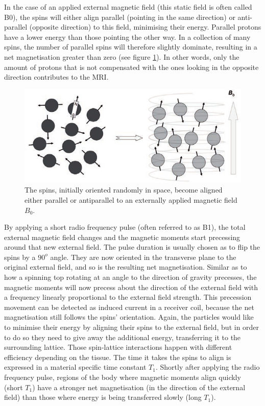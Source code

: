 In the case of an applied external magnetic field (this static field is often called B0), the spins will either align parallel (pointing in the same direction) or anti-parallel (opposite direction) to this field, minimising their energy.
Parallel protons have a lower energy than those pointing the other way.
In a collection of many spins, the number of parallel spins will therefore slightly dominate, resulting in a net magnetisation greater than zero (see figure \ref{fig:spin_align}).
In other words, only the amount of protons that is not compensated with the ones looking in the opposite direction contributes to the MRI.

\begin{figure}[h!]
\centering
\includegraphics[width=0.8\linewidth]{../fig/intro/spin_align}
\caption{The spins, initially oriented randomly in space, become aligned either parallel or antiparallel to an externally applied magnetic field $B_0$. \cite{Maidment2014}}
\label{fig:spin_align}
\end{figure}

By applying a short radio frequency pulse (often referred to as B1), the total external magnetic field changes and the magnetic moments start precessing around that new external field.
The pulse duration is usually chosen as to flip the spins by a $90^o$ angle.
They are now oriented in the transverse plane to the original external field, and so is the resulting net magnetisation.
Similar as to how a spinning top rotating at an angle to the direction of gravity precesses, the magnetic moments will now precess about the direction of the external field with a frequency linearly proportional to the external field strength.
This precession movement can be detected as induced current in a receiver coil, because the net magnetisation still follows the spins' orientation. 
Again, the particles would like to minimise their energy by aligning their spins to the external field, but in order to do so they need to give away the additional energy, transferring it to the surrounding lattice.
Those spin-lattice interactions happen with different efficiency depending on the tissue.
The time it takes the spins to align is expressed in a material specific time constant $T_1$.
Shortly after applying the radio frequency pulse, regions of the body where magnetic moments align quickly (short $T_1$) have a stronger net magnetisation (in the direction of the external field) than those where energy is being transferred slowly (long $T_1$).

